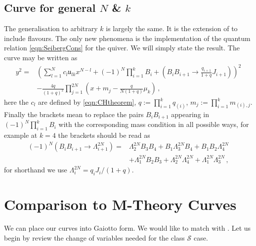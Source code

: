 \documentclass[main.tex]{subfiles}
\begin{document}
\subsection{Curve for general \texorpdfstring{$N$}{N} \& \texorpdfstring{$k$}{k}}
The generalisation to arbitrary $k$ is largely the same. It is the extension of \cite{Csaki:1997zg} to include flavours. The only new phenomena is the implementation of the quantum relation \eqref{eqn:SeibergCons} for the quiver. We will simply state the result. The curve may be written as
\begin{equation}
\begin{aligned}
y^2=&\left(\sum_{l=1}^Nc_{l}\mathfrak{u}_{lk}x^{N-l}+(-1)^N\prod_{i=1}^kB_{i}+\left(B_iB_{i+1}\to\frac{q_{i+1}}{1+q}J_{i+1}\right)\right)^2\\
&-\frac{4q}{(1+q)^2}\prod_{j=1}^{2N}\left(x+m_j-\frac{q}{N(1+q)}\mu_k\right)\,,
\end{aligned}
\end{equation}
here the $c_l$ are defined by \eqref{eqn:CHtheorem}, $q:=\prod_{i=1}^kq_{(i)}$, $m_j:=\prod_{i=1}^km_{(i),j}$. Finally the brackets mean to replace the pairs $B_iB_{i+1}$ appearing in $(-1)^N\prod_{i=1}^kB_{i}$ with the corresponding mass condition in all possible ways, for example at $k=4$ the brackets should be read as
\begin{equation}
\begin{aligned}
(-1)^N\left(B_iB_{i+1}\to\Lambda^{2N}_{i+1}\right)=&\Lambda^{2N}_2B_3B_4+B_1\Lambda^{2N}_3B_4+B_1B_2\Lambda^{2N}_4\\
&+\Lambda^{2N}_1B_2B_3+\Lambda^{2N}_2\Lambda^{2N}_4+\Lambda^{2N}_1\Lambda^{2N}_3\,,
\end{aligned}
\end{equation}
for shorthand we use $\Lambda_i^{2N}=q_{i}J_{i}/(1+q)$.
\section{Comparison to M-Theory Curves}
We can place our curves into Gaiotto form. We would like to match with \cite{Coman:2015bqq}. Let us begin by review the change of variables needed for the class $\mathcal{S}$ case.
\end{document}
